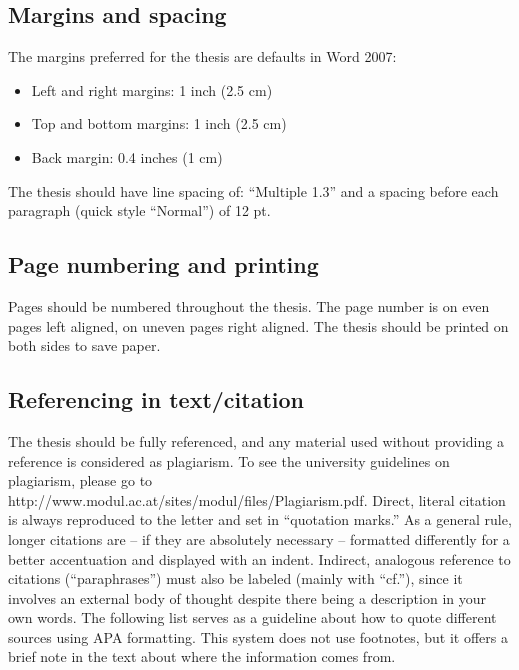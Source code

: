 \subsection{Margins and spacing}
\label{sec:margins}

The margins preferred for the thesis are defaults in Word 2007:
\begin{itemize}
\item Left and right margins: 1 inch (2.5 cm)
\item Top and bottom margins: 1 inch (2.5 cm)
\item Back margin: 0.4 inches (1 cm)
\end{itemize}
	
The thesis should have line spacing of: “Multiple 1.3” and a spacing before each paragraph (quick style “Normal”) of 12 pt. 

\subsection{Page numbering and printing}
\label{sec:pagenumbering}

Pages should be numbered throughout the thesis. The page number is on even pages left aligned, on uneven pages right aligned. The thesis should be printed on both sides to save paper. 

\subsection{Referencing in text/citation}
\label{sec:referencing}
The thesis should be fully referenced, and any material used without providing a reference is considered as plagiarism. 
To see the university guidelines on plagiarism, please go to http://www.modul.ac.at/sites/modul/files/Plagiarism.pdf. 
Direct, literal citation is always reproduced to the letter and set in “quotation marks.” As a general rule, longer citations are – if they are absolutely necessary – 
formatted differently for a better accentuation and displayed with an indent. Indirect, analogous reference to citations (“paraphrases”) must also be 
labeled (mainly with “cf.”), since it involves an external body of thought despite there being a description in your own words. The following list serves as a 
guideline about how to quote different sources using APA formatting. 
This system does not use footnotes, but it offers a brief note in the text about where the information comes from. 

\textcite{6.11}


